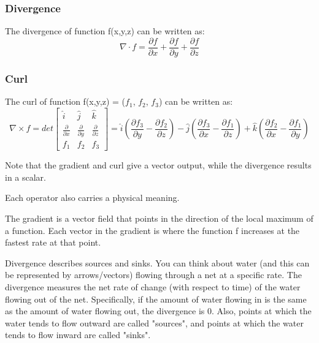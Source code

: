 \documentclass{article}
\begin{document}
\subsubsection{Divergence} %
The divergence of function f(x,y,z) can be written as: 
\begin{equation}
\nabla \cdot f = \frac{\partial f}{\partial x} + \frac{\partial f}{\partial y} + \frac{\partial f}{\partial z}
\end{equation}

\subsubsection{Curl} %
The curl of function f(x,y,z) = ($f_1$, $f_2$, $f_3$) can be written as:
\begin{equation}
\nabla \times f = det
  \begin{bmatrix}
    \hat{i} & \hat{j} & \hat{k}\\
    \frac{\partial}{\partial x} & \frac{\partial}{\partial y} & \frac{\partial}{\partial z}\\
    f_1 & f_2 & f_3
  \end{bmatrix}
  = \hat{i}(\frac{\partial f_3}{\partial y} - \frac{\partial f_2}{\partial{z}}) - \hat{j}(\frac{\partial f_3}{\partial x} - \frac{\partial f_1}{\partial{z}}) + \hat{k}(\frac{\partial f_2}{\partial{x}} - \frac{\partial f_1}{\partial y})
\end{equation}

\vspace{1em}

Note that the gradient and curl give a vector output, while the divergence results in a scalar.

\vspace{1em}

Each operator also carries a physical meaning. 

The gradient is a vector field that points in the direction of the local maximum of a function. Each vector in the gradient is where the function f increases at the fastest rate at that point.

Divergence describes sources and sinks. You can think about water (and this can be represented by arrows/vectors) flowing through a net at a specific rate. The divergence measures the net rate of change (with respect to time) of the water flowing out of the net. Specifically, if the amount of water flowing in is the same as the amount of water flowing out, the divergence is 0. Also, points at which the water tends to flow outward are called "sources", and points at which the water tends to flow inward are called "sinks". 
\end{document}
